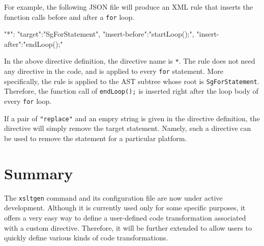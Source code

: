 For example, the following JSON file will produce an XML rule that
inserts the function calls before and after a \texttt{for} loop.
\begin{framed}
\begin{src}
{
  "*":{
    "target":"SgForStatement",
    "insert-before":"startLoop();",
    "insert-after":"endLoop();"
  }
}
\end{src}
\end{framed}
In the above directive definition, the directive name is \texttt{*}. The
rule does not need any directive in the code, and is applied to every
\texttt{for} statement. More specifically, the rule is applied to the
AST subtree whose root is \texttt{SgForStatement}. Therefore, the
function call of \texttt{endLoop();} is inserted right after the loop
body of every \texttt{for} loop.

If a pair of \texttt{"replace"} and an empry string is given in the
directive definition, the directive will simply remove the target
statement. Namely, such a directive can be used to remove the statement
for a particular platform.


\section{Summary}
The \texttt{xsltgen} command and its configuration file are now under
active development. Although it is currently used only for some specific
purposes, it offers a very easy way to define a user-defined code
transformation associated with a custom directive. Therefore, it will be
further extended to allow users to quickly define various kinds of code
transformations.
